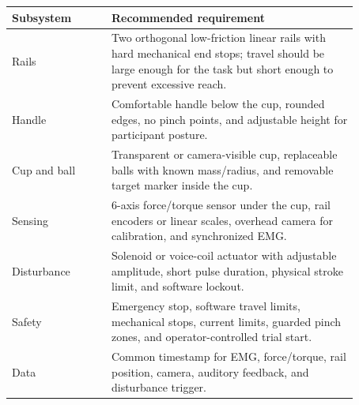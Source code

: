 \documentclass[11pt, a4paper]{article}
\begin{document}
\begin{center}
{\small
\begin{tabular}{p{0.25\linewidth}p{0.62\linewidth}}
\toprule
\textbf{Subsystem} & \textbf{Recommended requirement} \\
\midrule
Rails & Two orthogonal low-friction linear rails with hard mechanical end stops; travel should be large enough for the task but short enough to prevent excessive reach. \\
Handle & Comfortable handle below the cup, rounded edges, no pinch points, and adjustable height for participant posture. \\
Cup and ball & Transparent or camera-visible cup, replaceable balls with known mass/radius, and removable target marker inside the cup. \\
Sensing & 6-axis force/torque sensor under the cup, rail encoders or linear scales, overhead camera for calibration, and synchronized EMG. \\
Disturbance & Solenoid or voice-coil actuator with adjustable amplitude, short pulse duration, physical stroke limit, and software lockout. \\
Safety & Emergency stop, software travel limits, mechanical stops, current limits, guarded pinch zones, and operator-controlled trial start. \\
Data & Common timestamp for EMG, force/torque, rail position, camera, auditory feedback, and disturbance trigger. \\
\bottomrule
\end{tabular}}
\end{center}
\end{document}
